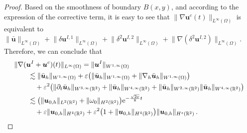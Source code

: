 \documentclass[pdflatex,sn-mathphys-num]{sn-jnl}%
\theoremstyle{thmstyleone}%
\theoremstyle{thmstyletwo}%
\theoremstyle{thmstylethree}%
\theoremstyle{thmstyletwo}
\begin{document}
\begin{proof}
	
	Based on the smoothness of boundary $B(x,y)$, and according to the expression of the corrective term, it is easy to see that $\lVert \nabla\boldsymbol{u}^{c}(t) \rVert_{L^\infty(\Omega)}$ is equivalent to $\lVert \bar{\boldsymbol{u}} \rVert_{L^\infty(\Omega)}
	+\lVert \delta\boldsymbol{u}^{I,1} \rVert_{L^\infty(\Omega)}
	+\lVert \delta^2\boldsymbol{u}^{I,2} \rVert_{L^\infty(\Omega)}
	+\lVert \nabla(\delta^2\boldsymbol{u}^{I,2}) \rVert_{L^\infty(\Omega)}$. Therefore, we can conclude that
	\begin{align*}
		&\lVert \nabla(\boldsymbol{u}^{I}+\boldsymbol{u}^{c})(t) \rVert_{L^\infty(\Omega)}
		=\lVert {\boldsymbol{u}}^I \rVert_{W^{1,\infty}(\Omega)}
		\\\notag
		&\qquad\lesssim	 
		\lVert \bar{\boldsymbol{u}}_h \rVert_{W^{1,\infty}(\Omega)}
		+\varepsilon\big(
		\lVert \bar{\boldsymbol{u}}_h \rVert_{W^{1,\infty}(\Omega)}
		+\lVert \nabla_h\bar{\boldsymbol{u}}_h \rVert_{W^{1,\infty}(\Omega)}
		\big)
		\\\notag
		&\qquad\quad+\varepsilon^2\big(
		\lVert \partial_t\bar{\boldsymbol{u}}_h \rVert_{W^{3,\infty}(\mathbb{R}^2)}
		+\lVert \bar{\boldsymbol{u}}_h \rVert_{W^{4,\infty}(\mathbb{R}^2)}
		+\lVert \bar{\boldsymbol{u}}_h \rVert_{W^{2,\infty}(\mathbb{R}^2)}
		\lVert \bar{\boldsymbol{u}}_h \rVert_{W^{4,\infty}(\mathbb{R}^2)}\big)
		\\\notag
		&\qquad\lesssim
		\big(
		\lVert{\boldsymbol{u}}_{0,h}\rVert_{L^2(\mathbb{R}^2)}+\lVert{\omega}_0\rVert_{H^2(\mathbb{R}^2)}
		\big)\mathrm{e}^{-\frac{\sqrt{2\nu}}{8}  t}
		\notag\\
		&\qquad\quad+\varepsilon
		\lVert {\boldsymbol{u}}_{0,h} \rVert_{H^{4}(\mathbb{R}^2)}
		+\varepsilon^2
		\big(
		1+
		\lVert {\boldsymbol{u}}_{0,h} \rVert_{H^{4}(\mathbb{R}^2)}
		\big)
		\lVert {\boldsymbol{u}}_{0,h} \rVert_{H^{s}(\mathbb{R}^2)}
		\,.\notag
	\end{align*}
	

\end{proof}
\end{document}
